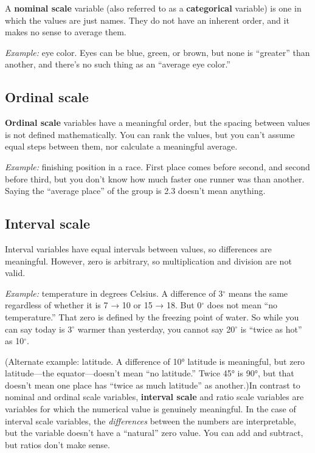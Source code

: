 \documentclass[
  letterpaper,
  DIV=11,
  numbers=noendperiod]{scrreprt}
\begin{document}
A \textbf{nominal scale} variable (also referred to as a
\textbf{categorical} variable) is one in which the values are just
names. They do not have an inherent order, and it makes no sense to
average them.

\emph{Example:} eye color. Eyes can be blue, green, or brown, but none
is ``greater'' than another, and there's no such thing as an ``average
eye color.''

\subsection{Ordinal scale}\label{ordinal-scale}

\textbf{Ordinal scale} variables have a meaningful order, but the
spacing between values is not defined mathematically. You can rank the
values, but you can't assume equal steps between them, nor calculate a
meaningful average.

\emph{Example:} finishing position in a race. First place comes before
second, and second before third, but you don't know how much faster one
runner was than another. Saying the ``average place'' of the group is
2.3 doesn't mean anything.

\subsection{Interval scale}\label{interval-scale}

Interval variables have equal intervals between values, so differences
are meaningful. However, zero is arbitrary, so multiplication and
division are not valid.

\emph{Example:} temperature in degrees Celsius. A difference of
3\(^\circ\) means the same regardless of whether it is 7 → 10 or 15 →
18. But 0\(^\circ\) does not mean ``no temperature.'' That zero is
defined by the freezing point of water. So while you can say today is
3\(^\circ\) warmer than yesterday, you cannot say 20\(^\circ\) is
``twice as hot'' as 10\(^\circ\).

(Alternate example: latitude. A difference of 10° latitude is
meaningful, but zero latitude---the equator---doesn't mean ``no
latitude.'' Twice 45° is 90°, but that doesn't mean one place has
``twice as much latitude'' as another.)In contrast to nominal and
ordinal scale variables, \textbf{interval scale} and ratio scale
variables are variables for which the numerical value is genuinely
meaningful. In the case of interval scale variables, the
\emph{differences} between the numbers are interpretable, but the
variable doesn't have a ``natural'' zero value. You can add and
subtract, but ratios don't make sense.
\end{document}
